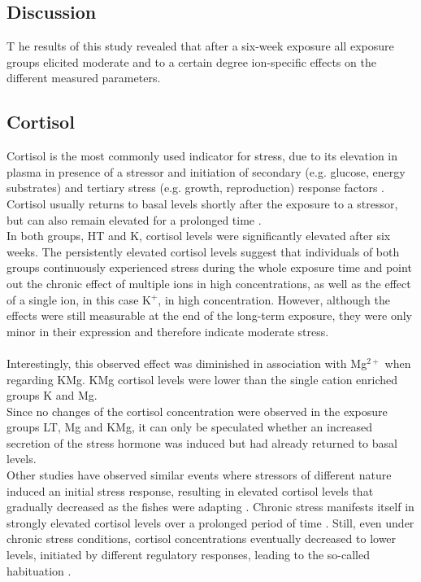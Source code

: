 \documentclass[twoside]{article}
\begin{document}
\begin{multicols}{2}

\section{Discussion}
\lettrine[nindent=0em,lines=2]{T}{}
he results of this study revealed that after a six-week exposure all exposure groups elicited moderate and to a certain degree ion-specific effects on the different measured parameters. \\
\subsection*{Cortisol}
Cortisol is the most commonly used indicator for stress, due to its elevation in plasma in presence of a stressor and initiation of secondary (e.g. glucose, energy substrates) and tertiary stress (e.g. growth, reproduction) response factors \citep{Schreck2001}. Cortisol usually returns to basal levels shortly after the exposure to a stressor, but can also remain elevated for a prolonged time \citep{bonga1997}. \\
In both groups, HT and K, cortisol levels were significantly elevated after six weeks.  The persistently elevated cortisol levels suggest that individuals of both groups continuously experienced stress during the whole exposure time and point out the chronic effect of multiple ions in high concentrations, as well as the effect of a single ion, in this case K$^+$, in high concentration. However, although the effects were still measurable at the end of the long-term exposure, they were only minor in their expression and therefore indicate moderate stress.  \\ \\
Interestingly, this observed effect was diminished in association with Mg$^{2+}$ when regarding KMg. KMg cortisol levels were lower than the single cation enriched groups K and Mg. \\
Since no changes of the cortisol concentration were observed in the exposure groups LT, Mg and KMg, it can only be speculated whether an increased secretion of the stress hormone was induced but had already returned to basal levels.\\
Other studies have observed similar events where stressors of different nature induced an initial stress response, resulting in elevated cortisol levels that gradually decreased as the fishes were adapting \citep{jeney1997,kammerer2010}. Chronic stress manifests itself in strongly elevated cortisol levels over a prolonged period of time \citep{mazeaud1977,pickering1989}. Still, even under chronic stress conditions, cortisol concentrations eventually decreased to lower levels, initiated by different regulatory responses, leading to the so-called habituation \citep{barton1987,mommsen1999,jentoft2005}. \\

\end{multicols}
\end{document}
